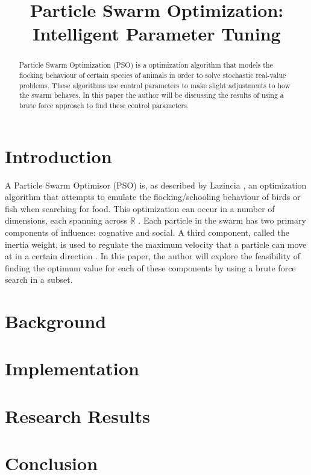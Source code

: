 \documentclass[conference]{IEEEtran}
\begin{document}
\title{Particle Swarm Optimization: Intelligent Parameter Tuning}
\author{
}
\maketitle

\begin{abstract}
Particle Swarm Optimization (PSO) is a optimization algorithm that models the flocking behaviour of certain species of animals in order to solve stochastic real-value problems. These algorithms use control parameters to make slight adjustments to how the swarm behaves. In this paper the author will be discussing the results of using a brute force approach to find these control parameters.
\end{abstract}

\IEEEpeerreviewmaketitle



\section{Introduction}
A Particle Swarm Optimisor (PSO) is, as described by Lazincia \cite{lazinica2009particle}, an optimization algorithm that attempts to emulate the flocking/schooling behaviour of birds or fish when searching for food. This optimization can occur in a number of dimensions, each spanning across $\mathbb{R}$ \cite{kennedy1997discrete}. Each particle in the swarm has two primary components of influence: cognative and social. A third component, called the inertia weight, is used to regulate the maximum velocity that a particle can move at in a certain direction \cite{eberhart2000comparing}. In this paper, the author will explore the feasibility of finding the optimum value for each of these components by using a brute force search in a subset.

\section{Background}



\section{Implementation}



\section{Research Results}



\section{Conclusion}




\end{document}

